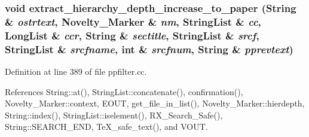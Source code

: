 \subsubsection{\setlength{\rightskip}{0pt plus 5cm}void extract\_\-hierarchy\_\-depth\_\-increase\_\-to\_\-paper ({\bf String} \& {\em ostrtext}, {\bf Novelty\_\-Marker} \& {\em nm}, {\bf String\-List} \& {\em cc}, {\bf Long\-List} \& {\em ccr}, {\bf String} \& {\em sectitle}, {\bf String\-List} \& {\em srcf}, {\bf String\-List} \& {\em srcfname}, int \& {\em srcfnum}, {\bf String} \& {\em pprevtext})}\label{ppfilter_8cc_a9}




Definition at line 389 of file ppfilter.cc.

References String::at(), String\-List::concatenate(), confirmation(), Novelty\_\-Marker::context, EOUT, get\_\-file\_\-in\_\-list(), Novelty\_\-Marker::hierdepth, String::index(), String\-List::iselement(), RX\_\-Search\_\-Safe(), String::SEARCH\_\-END, Te\-X\_\-safe\_\-text(), and VOUT.



